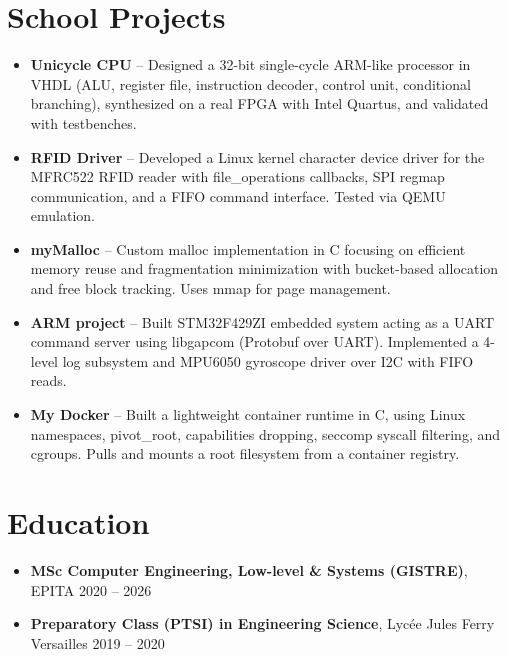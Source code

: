 \documentclass[9pt,a4paper]{article}
\begin{document}
\section*{School Projects}
\begin{tcolorbox}[mybox]
\begin{itemize}
\item \textbf{Unicycle CPU} -- Designed a 32-bit single-cycle ARM-like processor in VHDL (ALU, register file, instruction decoder, control unit, conditional branching), synthesized on a real FPGA with Intel Quartus, and validated with testbenches.

\item \textbf{RFID Driver} -- Developed a Linux kernel character device driver for the MFRC522 RFID reader with file\_operations callbacks, SPI regmap communication, and a FIFO command interface. Tested via QEMU emulation.

\item \textbf{myMalloc} -- Custom malloc implementation in C focusing on efficient memory reuse and fragmentation minimization with bucket-based allocation and free block tracking. Uses mmap for page management.

\item \textbf{ARM project} -- Built STM32F429ZI embedded system acting as a UART command server using libgapcom (Protobuf over UART). Implemented a 4-level log subsystem and MPU6050 gyroscope driver over I2C with FIFO reads.

\item \textbf{My Docker} -- Built a lightweight container runtime in C, using Linux namespaces, pivot\_root, capabilities dropping, seccomp syscall filtering, and cgroups. Pulls and mounts a root filesystem from a container registry.
\end{itemize}
\end{tcolorbox}


\section*{Education}
\begin{tcolorbox}[mybox]
\begin{itemize}
\item \textbf{MSc Computer Engineering, Low-level \& Systems (GISTRE)}, EPITA {\small{\hfill 2020 – 2026}}

\item \textbf{Preparatory Class (PTSI) in Engineering Science}, Lycée Jules Ferry Versailles {\small{\hfill 2019 – 2020}}
\end{itemize}
\end{tcolorbox}
\end{document}
